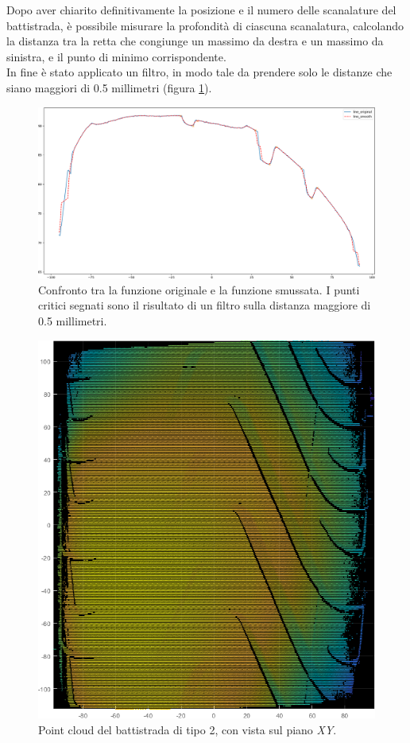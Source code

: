 \noindent Dopo aver chiarito definitivamente la posizione e il numero delle scanalature del battistrada, è possibile misurare la profondità di ciascuna scanalatura, calcolando la distanza tra la retta che congiunge un massimo da destra e un massimo da sinistra, e il punto di minimo corrispondente.\\
\newline
In fine è stato applicato un filtro, in modo tale da prendere solo le distanze che siano maggiori di 0.5 millimetri (figura \ref{fig:batt_2_analisi_10}).\\

\begin{figure}[H]
	\centering
	\includegraphics[width=0.9\columnwidth]{./pictures/batt_2_analisi_10.png}
	\caption{Confronto tra la funzione originale e la funzione smussata. I punti critici segnati sono il risultato di un filtro sulla distanza maggiore di 0.5 millimetri.}\label{fig:batt_2_analisi_10}
\end{figure}

\begin{figure}[H]
	\centering
	\includegraphics[width=0.5\columnwidth]{./pictures/battistrada.png}
	\caption{Point cloud del battistrada di tipo 2, con vista sul piano \textit{XY}.}\label{fig:battistrada}
\end{figure}

